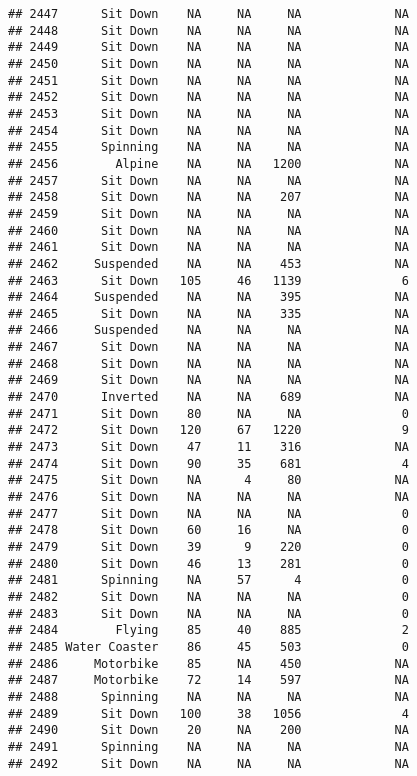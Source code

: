 \documentclass[
]{article}
\begin{document}
\begin{verbatim}
## 2447      Sit Down    NA     NA     NA             NA
## 2448      Sit Down    NA     NA     NA             NA
## 2449      Sit Down    NA     NA     NA             NA
## 2450      Sit Down    NA     NA     NA             NA
## 2451      Sit Down    NA     NA     NA             NA
## 2452      Sit Down    NA     NA     NA             NA
## 2453      Sit Down    NA     NA     NA             NA
## 2454      Sit Down    NA     NA     NA             NA
## 2455      Spinning    NA     NA     NA             NA
## 2456        Alpine    NA     NA   1200             NA
## 2457      Sit Down    NA     NA     NA             NA
## 2458      Sit Down    NA     NA    207             NA
## 2459      Sit Down    NA     NA     NA             NA
## 2460      Sit Down    NA     NA     NA             NA
## 2461      Sit Down    NA     NA     NA             NA
## 2462     Suspended    NA     NA    453             NA
## 2463      Sit Down   105     46   1139              6
## 2464     Suspended    NA     NA    395             NA
## 2465      Sit Down    NA     NA    335             NA
## 2466     Suspended    NA     NA     NA             NA
## 2467      Sit Down    NA     NA     NA             NA
## 2468      Sit Down    NA     NA     NA             NA
## 2469      Sit Down    NA     NA     NA             NA
## 2470      Inverted    NA     NA    689             NA
## 2471      Sit Down    80     NA     NA              0
## 2472      Sit Down   120     67   1220              9
## 2473      Sit Down    47     11    316             NA
## 2474      Sit Down    90     35    681              4
## 2475      Sit Down    NA      4     80             NA
## 2476      Sit Down    NA     NA     NA             NA
## 2477      Sit Down    NA     NA     NA              0
## 2478      Sit Down    60     16     NA              0
## 2479      Sit Down    39      9    220              0
## 2480      Sit Down    46     13    281              0
## 2481      Spinning    NA     57      4              0
## 2482      Sit Down    NA     NA     NA              0
## 2483      Sit Down    NA     NA     NA              0
## 2484        Flying    85     40    885              2
## 2485 Water Coaster    86     45    503              0
## 2486     Motorbike    85     NA    450             NA
## 2487     Motorbike    72     14    597             NA
## 2488      Spinning    NA     NA     NA             NA
## 2489      Sit Down   100     38   1056              4
## 2490      Sit Down    20     NA    200             NA
## 2491      Spinning    NA     NA     NA             NA
## 2492      Sit Down    NA     NA     NA             NA

\end{verbatim}
\end{document}
